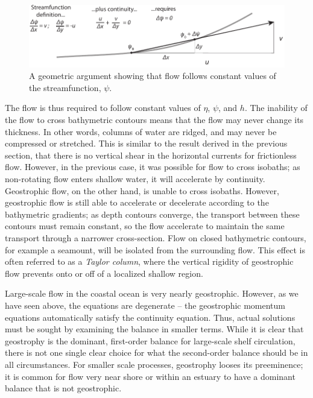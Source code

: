 \documentclass[11pt]{report}
\numberwithin{equation}{section}
\begin{document}
\begin{figure}[tb]
    \centering
    \includegraphics[width=6in]{streamfunction}   
    \caption{A geometric argument showing that flow follows constant values of the streamfunction, $\psi$.}
    \label{fig:streamfunction}
\end{figure}

The flow is thus required to follow constant values of $\eta$, $\psi$, and $h$.  The inability of the flow to cross bathymetric contours means that the flow may never change its thickness.  In other words, columns of water are ridged, and may never be compressed or stretched.  This is similar to the result derived in the previous section, that there is no vertical shear in the horizontal currents for frictionless flow.  However, in the previous case, it was possible for flow to cross isobaths; as non-rotating flow enters shallow water, it will accelerate by continuity.  Geostrophic flow, on the other hand, is unable to cross isobaths.  However, geostrophic flow is still able to accelerate or decelerate according to the bathymetric gradients; as depth contours converge, the transport between these contours must remain constant, so the flow accelerate to maintain the same transport through a narrower cross-section.  Flow on closed bathymetric contours, for example a seamount, will be isolated from the surrounding flow.  This effect is often referred to as a \emph{Taylor column}, where the vertical rigidity of geostrophic flow prevents onto or off of a localized shallow region.

Large-scale flow in the coastal ocean is very nearly geostrophic.  However, as we have seen above, the equations are degenerate -- the geostrophic momentum equations automatically satisfy the continuity equation.  Thus, actual solutions must be sought by examining the balance in smaller terms.  While it is clear that geostrophy is the dominant, first-order balance for large-scale shelf circulation, there is not one single clear choice for what the second-order balance should be in all circumstances.  For smaller scale processes, geostrophy looses its preeminence;  it is common for flow very near shore or within an estuary to have a dominant balance that is not geostrophic.
\end{document}
